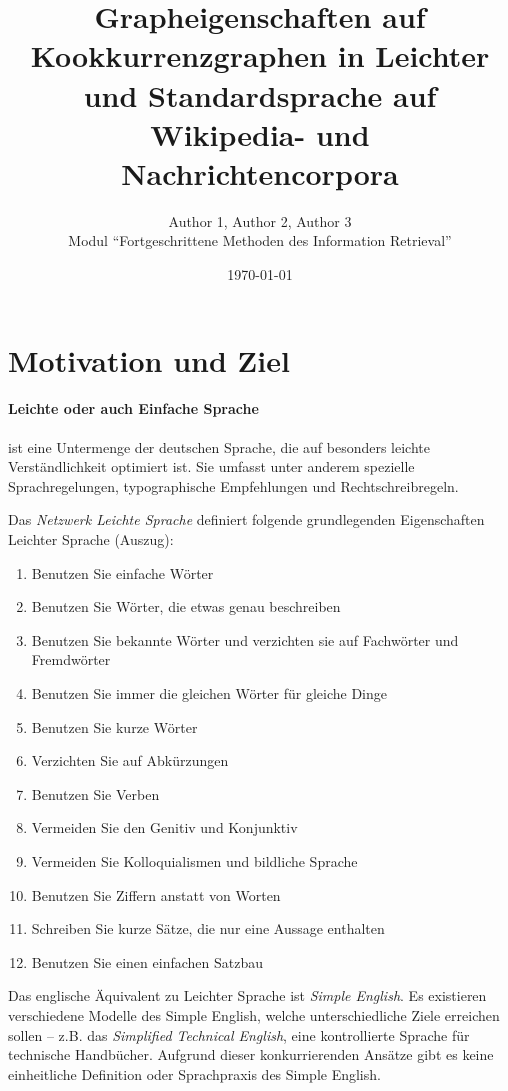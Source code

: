 \documentclass[11pt, a4paper]{article}
\title{Grapheigenschaften auf Kookkurrenzgraphen in Leichter und
    Standardsprache auf Wikipedia- und Nachrichtencorpora}
\author{Author 1, Author 2, Author 3\\
    Modul "`Fortgeschrittene Methoden des Information Retrieval"'}
\date{\today}
\begin{document}
\maketitle
\tableofcontents

\section{Motivation und Ziel}

\paragraph{Leichte oder auch Einfache Sprache} ist eine Untermenge der deutschen Sprache,
die auf besonders leichte Verst\"andlichkeit optimiert ist. Sie umfasst unter
anderem spezielle Sprachregelungen, typographische Empfehlungen und
Rechtschreibregeln. 

Das \emph{Netzwerk Leichte Sprache} definiert folgende grundlegenden
Eigenschaften Leichter Sprache\cite{nls_regeln} (Auszug):

\begin{enumerate}
	\item Benutzen Sie einfache W\"orter
	\item Benutzen Sie W\"orter, die etwas genau beschreiben
	\item Benutzen Sie bekannte W\"orter und verzichten sie auf Fachw\"orter und Fremdw\"orter
	\item Benutzen Sie immer die gleichen W\"orter f\"ur gleiche Dinge
	\item Benutzen Sie kurze W\"orter
	\item Verzichten Sie auf Abk\"urzungen
	\item Benutzen Sie Verben
	\item Vermeiden Sie den Genitiv und Konjunktiv
	\item Vermeiden Sie Kolloquialismen und bildliche Sprache
	\item Benutzen Sie Ziffern anstatt von Worten
	\item Schreiben Sie kurze S\"atze, die nur eine Aussage enthalten
	\item Benutzen Sie einen einfachen Satzbau
\end{enumerate}

Das englische \"Aquivalent zu Leichter Sprache ist \emph{Simple English}. Es
existieren verschiedene Modelle des Simple English, welche unterschiedliche
Ziele erreichen sollen -- z.B. das \emph{Simplified Technical English}, eine
kontrollierte Sprache f\"ur technische Handb\"ucher. Aufgrund dieser
konkurrierenden Ans\"atze gibt es keine einheitliche Definition oder
Sprachpraxis des Simple English.
\end{document}
